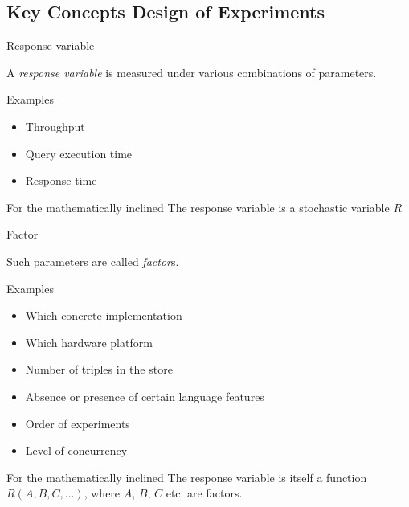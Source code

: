 \documentclass[english,usenames,dvipsnames,aspectratio=169]{beamer}
\begin{document}
\subsection{Key Concepts Design of Experiments}

\begin{frame}{Response variable}

 \Large
   A \emph{response variable} is measured under various
    combinations of parameters.
 \normalsize
      

    \begin{block}{Examples}
      \begin{itemize}
      \item Throughput
      \item Query execution time
      \item Response time
      \end{itemize}
    \end{block}

    \begin{block}{For the mathematically inclined}
      The response variable is a stochastic variable $R$
    \end{block}


\end{frame}

\begin{frame}{Factor}

\Large
Such parameters are called \emph{factor}s. 
\normalsize

\begin{block}{Examples}
  \begin{itemize}
  \item Which concrete implementation
  \item Which hardware platform
  \item Number of triples in the store
  \item Absence or presence of certain language features
  \item Order of experiments
  \item Level of concurrency
  \end{itemize}
\end{block}

\begin{block}{For the mathematically inclined}
  The response variable is itself a function 
  $R ( A, B, C, \ldots ) $, 
  where $A$, $B$, $C$ etc. are factors.
\end{block}


\end{frame}
\end{document}
